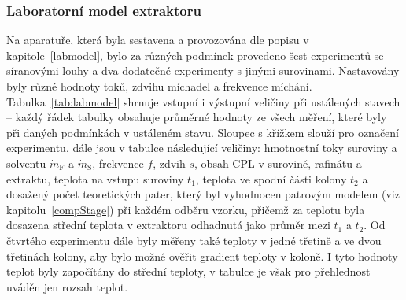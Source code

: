 \subsubsection{Laboratorní model extraktoru} \label{reslabmodel}
Na aparatuře, která byla sestavena a provozována dle popisu v kapitole~\ref{labmodel}, bylo za různých podmínek provedeno šest experimentů se síranovými louhy a dva dodatečné experimenty s jinými surovinami.
Nastavovány byly různé hodnoty toků, zdvihu míchadel a frekvence míchání.
Tabulka~\ref{tab:labmodel} shrnuje vstupní i výstupní veličiny při ustálených stavech -- každý řádek tabulky obsahuje průměrné hodnoty ze všech měření, které byly při daných podmínkách v ustáleném stavu.
Sloupec s křížkem slouží pro označení experimentu, dále jsou v tabulce následující veličiny: hmotnostní toky suroviny a solventu $\dot{m}_\mathrm{F}$ a $\dot{m}_\mathrm{S}$, frekvence $f$, zdvih $s$, obsah CPL v surovině, rafinátu a extraktu, teplota na vstupu suroviny $t_1$, teplota ve spodní části kolony $t_2$ a dosažený počet teoretických pater, který byl vyhodnocen patrovým modelem (viz kapitolu~\ref{compStage}) při každém odběru vzorku, přičemž za teplotu byla dosazena střední teplota v extraktoru odhadnutá jako průměr mezi $t_1$ a $t_2$.
Od čtvrtého experimentu dále byly měřeny také teploty v jedné třetině a ve dvou třetinách kolony, aby bylo možné ověřit gradient teploty v koloně.
I tyto hodnoty teplot byly započítány do střední teploty, v tabulce je však pro přehlednost uváděn jen rozsah teplot.

